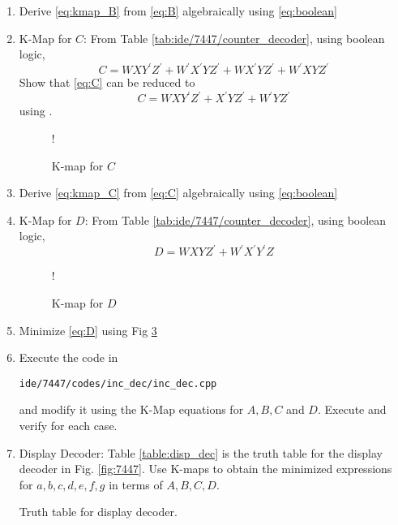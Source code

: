 \begin{enumerate}[label=\arabic*.,ref=\theenumi]
%
Show that \eqref{eq:B} can be reduced to
\begin{equation}
\label{eq:kmap_B}
B = WX^{\prime}Z^{\prime} + W^{\prime}XZ^{\prime}
\end{equation}
using Fig \ref{fig:kmap_B}
%
\begin{figure}[H]
	\centering
\resizebox {0.5\columnwidth} {!} {

}
\caption{K-map for $B$}
\label{fig:kmap_B}
\end{figure}
\item Derive \eqref{eq:kmap_B} from \eqref{eq:B} algebraically using \eqref{eq:boolean}
%
\item {K-Map for $C$: }
From Table \ref{tab:ide/7447/counter_decoder}, using boolean logic,
\begin{equation}
\label{eq:C}
C = WXY^{\prime}Z^{\prime} + W^{\prime}X^{\prime}YZ^{\prime}
+WX^{\prime}YZ^{\prime}
+W^{\prime}XYZ^{\prime}
\end{equation}
%
%
Show that \eqref{eq:C} can be reduced to
\begin{equation}
\label{eq:kmap_C}
C = WXY^{\prime}Z^{\prime}  +  X^{\prime}YZ^{\prime} + W^{\prime}YZ^{\prime}
\end{equation}
using .
%
\begin{figure}[H]
	\centering
\resizebox {0.5\columnwidth} {!} {

}
\caption{K-map for $C$}
\label{fig:kmap_C}
\end{figure}
%
\item 
Derive \eqref{eq:kmap_C} from \eqref{eq:C} algebraically using \eqref{eq:boolean}
%
\item {K-Map for $D$: }
From Table \ref{tab:ide/7447/counter_decoder}, using boolean logic,
\begin{equation}
\label{eq:D}
D = WXYZ^{\prime} + W^{\prime}X^{\prime}Y^{\prime}Z
\end{equation}
%
\begin{figure}[!htb]
	\centering
\resizebox {0.5\columnwidth} {!} {

}
\caption{K-map for $D$}
\label{fig:kmap_D}
\end{figure}
%
\item 
Minimize \eqref{eq:D} using Fig \ref{fig:kmap_D}
%
\item Execute the code in
\begin{lstlisting}
ide/7447/codes/inc_dec/inc_dec.cpp
\end{lstlisting}
%
and modify it using the K-Map equations for $A,B,C$ and $D$. Execute and verify for each case.
\item {Display Decoder:}
Table \ref{table:disp_dec} is the truth table for the display decoder in Fig.
\ref{fig:7447}.
Use K-maps to obtain the minimized expressions for $a,b,c,d,e,f,g$ in terms of $A,B,C,D$.
%
\begin{table}[!htb]
	\centering

\caption{Truth table for display decoder.}
\label{table:disp_dec}
\end{table}
\end{enumerate}

